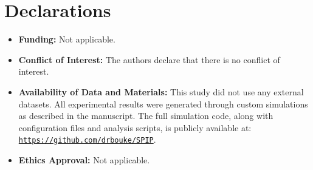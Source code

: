 \documentclass[twocolumn,10pt]{article}
\begin{document}
\vspace{0.8em}


\section*{Declarations}
\vspace{0.8em}
\begin{itemize}
  \item \textbf{Funding:} Not applicable.
  
  \item \textbf{Conflict of Interest:} The authors declare that there is no conflict of interest.

\item \textbf{Availability of Data and Materials: } 
This study did not use any external datasets. All experimental results were generated through custom simulations as described in the manuscript. The full simulation code, along with configuration files and analysis scripts, is publicly available at:  
\href{https://github.com/drbouke/SPIP}{\texttt{https://github.com/drbouke/SPIP}}.

  \item \textbf{Ethics Approval:} Not applicable.
\end{itemize}

\vspace{10em}
\end{document}
